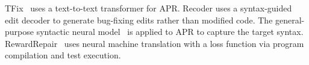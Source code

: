 TFix~\cite{tfix-21} uses a text-to-text transformer for APR. Recoder
\cite{recoder-fse21} uses a syntax-guided edit decoder to generate
bug-fixing edits rather than modified code.  The general-purpose
syntactic neural model~\cite{yin-neubig-2017-syntactic} is applied to
APR to capture the target syntax. RewardRepair~\cite{monperrus-icse22}
uses neural machine translation with a loss function via program
compilation and test execution.
  






